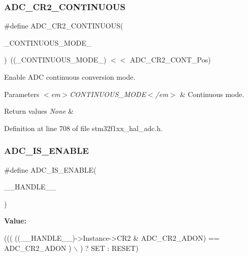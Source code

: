 \subsubsection{\texorpdfstring{A\+D\+C\+\_\+\+C\+R2\+\_\+\+C\+O\+N\+T\+I\+N\+U\+O\+US}{ADC\_CR2\_CONTINUOUS}}
{\footnotesize\ttfamily \#define A\+D\+C\+\_\+\+C\+R2\+\_\+\+C\+O\+N\+T\+I\+N\+U\+O\+US(\begin{DoxyParamCaption}\item[{}]{\+\_\+\+C\+O\+N\+T\+I\+N\+U\+O\+U\+S\+\_\+\+M\+O\+D\+E\+\_\+ }\end{DoxyParamCaption})~((\+\_\+\+C\+O\+N\+T\+I\+N\+U\+O\+U\+S\+\_\+\+M\+O\+D\+E\+\_\+) $<$$<$ A\+D\+C\+\_\+\+C\+R2\+\_\+\+C\+O\+N\+T\+\_\+\+Pos)}



Enable A\+DC continuous conversion mode. 


\begin{DoxyParams}{Parameters}
{\em $<$em$>$\+C\+O\+N\+T\+I\+N\+U\+O\+U\+S\+\_\+\+M\+O\+D\+E$<$/em$>$} & Continuous mode. \\
\hline
\end{DoxyParams}

\begin{DoxyRetVals}{Return values}
{\em None} & \\
\hline
\end{DoxyRetVals}


Definition at line 708 of file stm32f1xx\+\_\+hal\+\_\+adc.\+h.

\mbox{\label{group___a_d_c___private___macros_gafe3a7a04ff078c62ae98b19403f696c7}} 
\subsubsection{\texorpdfstring{A\+D\+C\+\_\+\+I\+S\+\_\+\+E\+N\+A\+B\+LE}{ADC\_IS\_ENABLE}}
{\footnotesize\ttfamily \#define A\+D\+C\+\_\+\+I\+S\+\_\+\+E\+N\+A\+B\+LE(\begin{DoxyParamCaption}\item[{}]{\+\_\+\+\_\+\+H\+A\+N\+D\+L\+E\+\_\+\+\_\+ }\end{DoxyParamCaption})}

{\bfseries Value\+:}
\begin{DoxyCode}
((( ((\_\_HANDLE\_\_)->Instance->CR2 & ADC\_CR2\_ADON) == ADC\_CR2\_ADON )           \(\backslash\)
   ) ? SET : RESET)
\end{DoxyCode}


